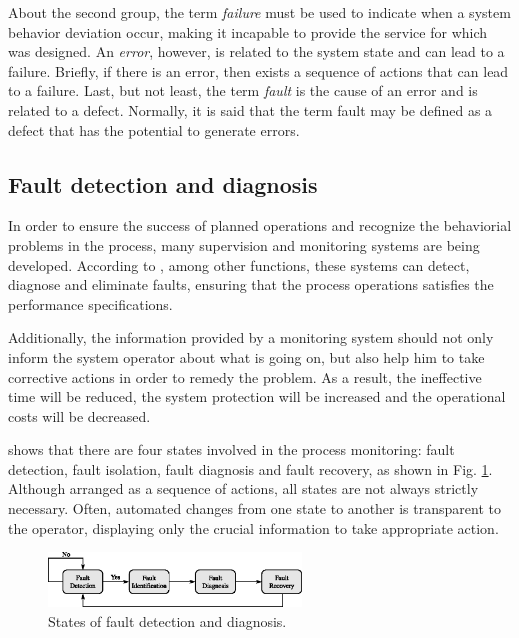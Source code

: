 \documentclass[10pt,fleqn,a4paper]{article}
\begin{document}
About the second group, the term {\it failure} must be used to indicate when
a system behavior deviation occur, making it incapable to provide the service
for which was designed. An {\it error}, however, is related to the system state
and can lead to a failure. Briefly, if there is an error, then exists a sequence
of actions that can lead to a failure. Last, but not least, the term {\it fault}
is the cause of an error and is related to a defect. Normally, it is said that
the term fault may be defined as a defect that has the potential to generate
errors.

\subsection{Fault detection and diagnosis}
In order to ensure the success of planned operations and recognize the
behaviorial problems in the process, many supervision and monitoring systems are
being developed. According to \citet{chiang:2001}, among other functions, these
systems can detect, diagnose and eliminate faults, ensuring that the process
operations satisfies the performance specifications.

Additionally, the information provided by a monitoring system should not only
inform the system operator about what is going on, but also help him to take
corrective actions in order to remedy the problem. As a result, the ineffective
time will be reduced, the system protection will be increased and the
operational costs will be decreased.

\citet{chiang:2001} shows that there are four states involved in the process
monitoring: fault detection, fault isolation, fault diagnosis and fault
recovery, as shown in Fig. \ref{fig:states}. Although arranged as a sequence of
actions, all states are not always strictly necessary. Often, automated changes
from one state to another is transparent to the operator, displaying only the
crucial information to take appropriate action.

\begin{figure}[htb]
\centering
    \includegraphics[width=0.6\textwidth]{imgs/states}
    \caption{States of fault detection and diagnosis.}
    \label{fig:states}
\end{figure}
\end{document}

